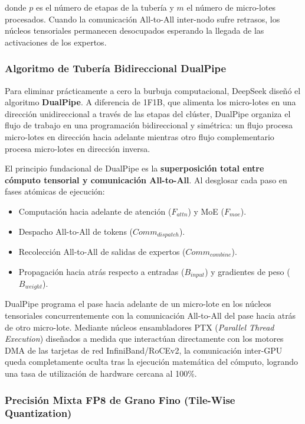 donde $p$ es el número de etapas de la tubería y $m$ el número de micro-lotes procesados. Cuando la comunicación All-to-All inter-nodo sufre retrasos, los núcleos tensoriales permanecen desocupados esperando la llegada de las activaciones de los expertos.

\subsubsection{Algoritmo de Tubería Bidireccional DualPipe}

Para eliminar prácticamente a cero la burbuja computacional, DeepSeek diseñó el algoritmo \textbf{DualPipe}. A diferencia de 1F1B, que alimenta los micro-lotes en una dirección unidireccional a través de las etapas del clúster, DualPipe organiza el flujo de trabajo en una programación bidireccional y simétrica: un flujo procesa micro-lotes en dirección hacia adelante mientras otro flujo complementario procesa micro-lotes en dirección inversa.

El principio fundacional de DualPipe es la \textbf{superposición total entre cómputo tensorial y comunicación All-to-All}. Al desglosar cada paso en fases atómicas de ejecución:
\begin{itemize}
    \item Computación hacia adelante de atención ($F_{attn}$) y MoE ($F_{moe}$).
    \item Despacho All-to-All de tokens ($Comm_{dispatch}$).
    \item Recolección All-to-All de salidas de expertos ($Comm_{combine}$).
    \item Propagación hacia atrás respecto a entradas ($B_{input}$) y gradientes de peso ($B_{weight}$).
\end{itemize}

DualPipe programa el pase hacia adelante de un micro-lote en los núcleos tensoriales concurrentemente con la comunicación All-to-All del pase hacia atrás de otro micro-lote. Mediante núcleos ensambladores PTX (\textit{Parallel Thread Execution}) diseñados a medida que interactúan directamente con los motores DMA de las tarjetas de red InfiniBand/RoCEv2, la comunicación inter-GPU queda completamente oculta tras la ejecución matemática del cómputo, logrando una tasa de utilización de hardware cercana al 100\%.

\subsubsection{Precisión Mixta FP8 de Grano Fino (Tile-Wise Quantization)}

